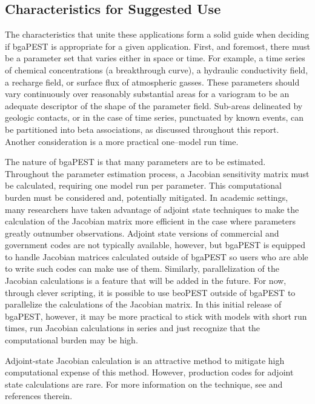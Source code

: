 \documentclass[11pt,oneside,onecolumn]{usgsreport}
\begin{document}
\begin{multicols}{2}
\subsection{Characteristics for Suggested Use}

The characteristics that unite these applications form a solid guide
when deciding if bgaPEST is appropriate for a given application. First,
and foremost, there must be a parameter set that varies either in
space or time. For example, a time series of chemical concentrations
(a breakthrough curve), a hydraulic conductivity field, a recharge
field, or surface flux of atmospheric gasses. These parameters should
vary continuously over reasonably substantial areas for a variogram
to be an adequate descriptor of the shape of the parameter field.
Sub-areas delineated by geologic contacts, or in the case of time
series, punctuated by known events, can be partitioned into beta associations,
as discussed throughout this report. Another consideration is a more
practical one--model run time. 

The nature of bgaPEST is that many parameters are to be estimated.
Throughout the parameter estimation process, a Jacobian sensitivity
matrix must be calculated, requiring one model run per parameter.
This computational burden must be considered and, potentially mitigated.
In academic settings, many researchers have taken advantage of adjoint
state techniques to make the calculation of the Jacobian matrix more
efficient in the case where parameters greatly outnumber observations.
Adjoint state versions of commercial and government codes are not
typically available, however, but bgaPEST is equipped to handle Jacobian
matrices calculated outside of bgaPEST so users who are able to write
such codes can make use of them. Similarly, parallelization of the
Jacobian calculations is a feature that will be added in the future.
For now, through clever scripting, it is possible to use beoPEST outside
of bgaPEST to parallelize the calculations of the Jacobian matrix.
In this initial release of bgaPEST, however, it may be more practical
to stick with models with short run times, run Jacobian calculations
in series and just recognize that the computational burden may be
high. 

Adjoint-state Jacobian calculation is an attractive method to mitigate
high computational expense of this method. However, production codes
for adjoint state calculations are rare. For more information on the
technique, see \citep{TownleyWilson1985,Sykes1985,SamperNeuman1986,RamaRao1995,neupauerWilson1999}
and references therein.


\end{multicols}
\end{document}
